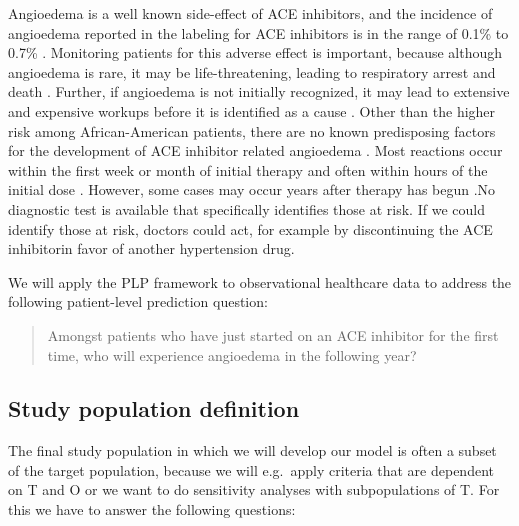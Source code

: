 \documentclass[11pt]{book}
\begin{document}
Angioedema is a well known side-effect of ACE inhibitors, and the
incidence of angioedema reported in the labeling for ACE inhibitors is
in the range of 0.1\% to 0.7\% \citep{byrd_2006}. Monitoring patients
for this adverse effect is important, because although angioedema is
rare, it may be life-threatening, leading to respiratory arrest and
death \citep{norman_2013}. Further, if angioedema is not initially
recognized, it may lead to extensive and expensive workups before it is
identified as a cause \citep{norman_2013, thompson_1993}. Other than the
higher risk among African-American patients, there are no known
predisposing factors for the development of ACE inhibitor related
angioedema \citep{byrd_2006}. Most reactions occur within the first week
or month of initial therapy and often within hours of the initial dose
\citep{circardi_2004}. However, some cases may occur years after therapy
has begun \citep{mara_1996}.No diagnostic test is available that
specifically identifies those at risk. If we could identify those at
risk, doctors could act, for example by discontinuing the ACE
inhibitorin favor of another hypertension drug.

We will apply the PLP framework to observational healthcare data to
address the following patient-level prediction question:

\begin{quote}
Amongst patients who have just started on an ACE inhibitor for the first
time, who will experience angioedema in the following year?
\end{quote}

\subsection{Study population
definition}\label{study-population-definition}

The final study population in which we will develop our model is often a
subset of the target population, because we will e.g.~apply criteria
that are dependent on T and O or we want to do sensitivity analyses with
subpopulations of T. For this we have to answer the following questions:
\end{document}
